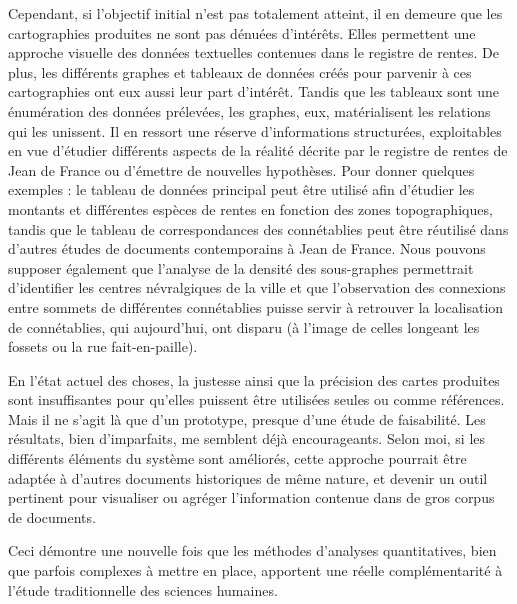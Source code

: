 Cependant, si l'objectif initial n'est pas totalement atteint, il en demeure que les cartographies produites ne sont pas dénuées d'intérêts. Elles permettent une approche visuelle des données textuelles contenues dans le registre de rentes. De plus, les différents graphes et tableaux de données créés pour parvenir à ces cartographies ont eux aussi leur part d'intérêt. Tandis que les tableaux sont une énumération des données prélevées, les graphes, eux, matérialisent les relations qui les unissent. Il en ressort une réserve d'informations structurées, exploitables en vue d'étudier différents aspects de la réalité décrite par le registre de rentes de Jean de France ou d'émettre de nouvelles hypothèses. Pour donner quelques exemples : le tableau de données principal peut être utilisé afin d'étudier les montants et différentes espèces de rentes en fonction des zones topographiques, tandis que le tableau de correspondances des connétablies  peut être réutilisé dans d'autres études de documents contemporains à Jean de France.
Nous pouvons supposer également que l'analyse de la densité des sous-graphes permettrait d'identifier les centres névralgiques de la ville et que l'observation des connexions entre sommets de différentes connétablies puisse servir à retrouver la localisation de connétablies, qui aujourd'hui, ont disparu (à l'image de celles longeant les fossets ou la rue fait-en-paille).

En l'état actuel des choses, la justesse ainsi que la précision des cartes produites sont insuffisantes pour qu'elles puissent être utilisées seules ou comme références.
Mais il ne s'agit là que d'un prototype, presque d'une étude de faisabilité. Les résultats, bien d'imparfaits, me semblent déjà encourageants. Selon moi, si les différents éléments du système sont améliorés, cette approche pourrait être adaptée à d'autres documents historiques de même nature, et devenir un outil pertinent pour visualiser ou agréger l'information contenue dans de gros corpus de documents. 

Ceci démontre une nouvelle fois que les méthodes d'analyses quantitatives, bien que parfois complexes à mettre en place,  apportent une réelle complémentarité à l'étude traditionnelle des sciences humaines.

